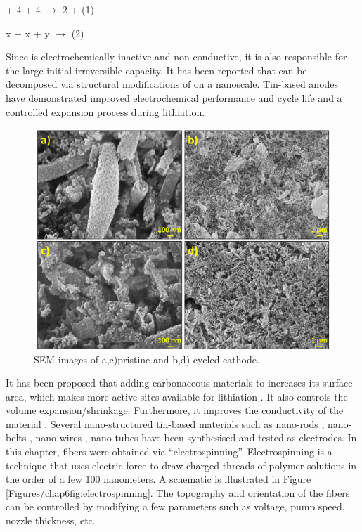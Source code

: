 \begin{center}
 + 4 + 4 $\longrightarrow$ 2 +  (1) 
\end{center}
\begin{center}
x + x + y $\longrightarrow$   (2)
\end{center}

Since  is electrochemically inactive and non-conductive, it is also responsible for the large initial irreversible capacity. It has been reported that  can be decomposed via structural modifications of  on a nanoscale. Tin-based anodes have demonstrated improved electrochemical performance and cycle life and a controlled expansion process during lithiation.  

\begin{figure}[th!]
\centering
\includegraphics[width=\textwidth]{Figures/chap6fig/SnO2SEM}
\caption{SEM images of a,c)pristine and b,d) cycled  cathode.}
\label{Figures/chap6fig:SnO2SEM}
\end{figure}

It has been proposed that adding carbonaceous materials to  increases its surface area, which makes more active sites available for lithiation \cite{navarro-suarez_2d_nodate}. It also controls the volume expansion/shrinkage. Furthermore, it improves the conductivity of the material \cite{nowak_composites_2018}. Several nano-structured tin-based materials such as nano-rods \cite{liu_direct_2009}, nano-belts \cite{duan_single_2005}, nano-wires \cite{huang_situ_2010}, nano-tubes \cite{wang_large-scale_2011} have been synthesised and tested as electrodes. In this chapter,  fibers were obtained via  \enquote{electrospinning}. Electrospinning is a technique that uses electric force to draw charged threads of polymer solutions in the order of a few 100 nanometers. A schematic is illustrated in Figure \ref{Figures/chap6fig:electrospinning}. The topography and orientation of the fibers can be controlled by modifying a few parameters such as voltage, pump speed, nozzle thickness, etc. 

